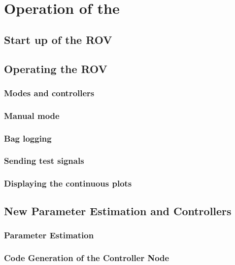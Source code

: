\chapter{Operation of the \abbrROV} \label{app:operation}

\section{Start up of the ROV}

\section{Operating the ROV}

\subsection{Modes and controllers}

\subsection{Manual mode}

\subsection{Bag logging}

\subsection{Sending test signals}


\subsection{Displaying the continuous plots}


\section{New Parameter Estimation and Controllers}
\subsection{Parameter Estimation}


\subsection{Code Generation of the Controller Node}


